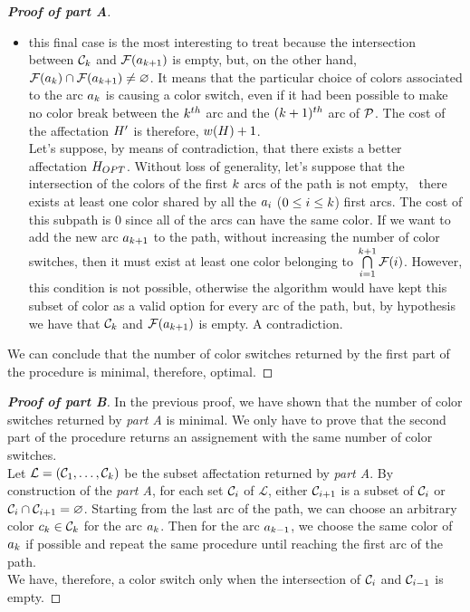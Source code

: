 \begin{proof}[\normalfont\textbf{Proof of \textit{part A}}]
\begin{itemize}
\begin{itemize}
			      \item this final case is the most interesting to treat because the intersection between $\mathcal{C}_{k}$ and $\mathcal{F}(a_{k+1})$ is empty, but, on the other hand, $\mathcal{F}(a_{k}) \cap \mathcal{F}(a_{k+1}) \neq \varnothing$. It means that the particular choice of colors associated to the arc $a_k$ is causing a color switch, even if it had been possible to make no color break between the $k^{th}$ arc and the  $(k+1)^{th}$ arc of $\mathcal{P}$. The cost of the affectation $H'$ is therefore, $w(H) + 1$.\\
			            Let's suppose, by means of contradiction, that there exists a better affectation $H_{OPT}$. Without loss of generality, let's suppose that the intersection of the colors of the first $k$ arcs of the path is not empty, \ie\ there exists at least one color shared by all the $a_i$ ($0 \leq i \leq k$) first arcs. The cost of this subpath is $0$ since all of the arcs can have the same color. If we want to add the new arc $a_{k + 1}$ to the path, without increasing the number of color switches, then it must exist at least one color belonging to $\bigcap\limits_{i = 1}^{k + 1} \mathcal{F}(i)$. However, this condition is not possible, otherwise the algorithm would have kept this subset of color as a valid option for every arc of the path, but, by hypothesis we have that $\mathcal{C}_k$ and $\mathcal{F}(a_{k + 1})$ is empty. A contradiction.
		      \end{itemize}
	\end{itemize}
	We can conclude that the number of color switches returned by the first part of the procedure is minimal, therefore, optimal.
\end{proof}

\begin{proof}[\normalfont\textbf{Proof of \textit{part B}}]
	In the previous proof, we have shown that the number of color switches returned by \textit{part A} is minimal. We only have to prove that the second part of the procedure returns an assignement with the same number of color switches.\\
	Let $\mathcal{L} = (\mathcal{C}_1,\ldots,\mathcal{C}_{k})$ be the subset affectation returned by \textit{part A}. By construction of the \textit{part A}, for each set $\mathcal{C}_i$ of $\mathcal{L}$, either $\mathcal{C}_{i+1}$ is a subset of $\mathcal{C}_i$ or $\mathcal{C}_i \cap \mathcal{C}_{i+1} = \varnothing$.
	Starting from the last arc of the path, we can choose an arbitrary color $c_k \in \mathcal{C}_k$ for the arc $a_k$. Then for the arc $a_{k-1}$, we choose the same color of $a_k$ if possible and repeat the same procedure until reaching the first arc of the path.\\
	We have, therefore, a color switch only when the intersection of $\mathcal{C}_i$ and $\mathcal{C}_{i-1}$ is empty.
\end{proof}


